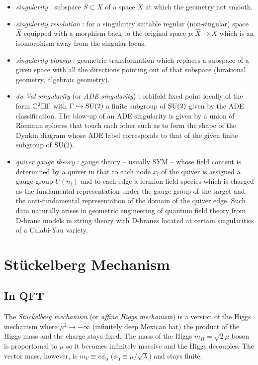 \documentclass[a4paper,8pt]{article}
\begin{document}
\begin{itemize}
        \item \emph{singularity} : subspace $S\subset X$ of a space $X$ at which the geometry not smooth.
        \item \emph{singularity resolution} : for a singularity  suitable regular (non-singular) space $\hat{X}$ equipped with a morphism back to the original space $p:\hat{X}\to X$ which is an isomorphism away from the singular locus.
        \item \emph{singularity blowup} : geometric transformation which replaces a subspace of a given space with all the directions pointing out of that subspace (birational geometry, algebraic geometry).
        \item \emph{du Val singularity} (or \emph{ADE singularity}) : orbifold fixed point locally of the form $\mathbb{C}^2\square\Gamma$ with $\Gamma\hookrightarrow\text{SU}(2)$ a finite subgroup of $\text{SU}(2)$ given by the ADE classification. The blow-up of an ADE singularity is given by a union of Riemann spheres that touch each other such as to form the shape of the Dynkin diagram whose ADE label corresponds to that of the given finite subgroup of $\text{SU}(2)$.
        \item \emph{quiver gauge theory} : gauge theory -- usually SYM -- whose field content is determined by a quiver in that to each node $x_i$ of the quiver is assigned a gauge group $U(n_i)$ and to each edge a fermion field species which is charged as the fundamental representation under the gauge group of the target and the anti-fundamental representation of the domain of the quiver edge. Such data naturally arises in geometric engineering of quantum field theory from D-brane models in string theory with D-branes located at certain singularities of a Calabi-Yau variety.
    \end{itemize}

\section{Stückelberg Mechanism}

    \subsection{In QFT}

        The \emph{Stückelberg mechanism} (or \emph{affine Higgs mechanism}) is a version of the Higgs mechanism where $\mu^2\to-\infty$ (infinitely deep Mexican hat) the product of the Higgs mass and the charge stays fixed. The mass of the Higgs $m_H=\sqrt{2}\mu$ boson is proportional to $\mu$ so it becomes infinitely massive and the Higgs decouples. The vector mass, however, is $m_V\equiv e\phi_0$ ($\phi_0\equiv\mu/\sqrt{\lambda}$) and stays finite.
\end{document}
